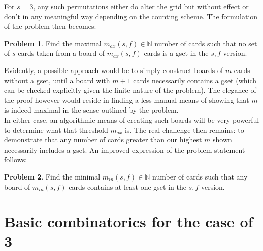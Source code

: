 \documentclass{article}
\theoremstyle{definition}
\newtheorem*{problem}{Problem}
\theoremstyle{remark}
\begin{document}
For $s=3$, any such permutations either do alter the grid but without effect or don't in any meaningful way depending on the counting scheme.
\bigbreak
The formulation of the problem then becomes:
\begin{problem}
Find the maximal $m_{ax}(s,f)\in\mathbb{N}$ number of cards such that no set of $s$ cards taken from a board of $m_{ax}(s,f)$ cards is a gset in the $s,f$-version.
\end{problem}
Evidently, a possible approach would be to simply construct boards of $m$ cards without a gset, until a board with $m+1$ cards necessarily contains a gset (which can be checked explicitly given the finite nature of the problem). The elegance of the proof however would reside in finding a less manual means of showing that $m$ is indeed maximal in the sense outlined by the problem. \\
In either case, an algorithmic means of creating such boards will be very powerful to determine what that threshold $m_{ax}$ is. The real challenge then remains: to demonstrate that any number of cards greater than our highest $m$ shown necessarily includes a gset. An improved expression of the problem statement follows:
\begin{problem}
Find the minimal $m_{in}(s,f)\in\mathbb{N}$ number of cards such that any board of $m_{in}(s,f)$ cards contains at least one gset in the $s,f$-version.
\end{problem}

\section{Basic combinatorics for the case of 3}\label{sec:combin3}
\end{document}
